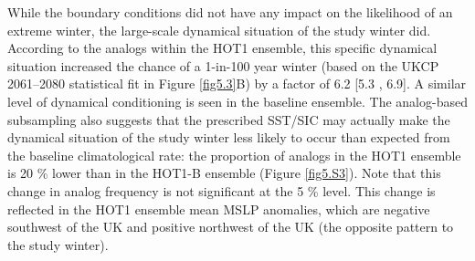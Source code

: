       While the boundary conditions did not have any impact on the likelihood of an extreme winter, the large-scale dynamical situation of the study winter did. According to the analogs within the HOT1 ensemble, this specific dynamical situation increased the chance of a 1-in-100 year winter (based on the UKCP 2061--2080 statistical fit in Figure \ref{fig5.3}B) by a factor of 6.2 [5.3 , 6.9]. A similar level of dynamical conditioning is seen in the baseline ensemble. The analog-based subsampling also suggests that the prescribed SST/SIC may actually make the dynamical situation of the study winter less likely to occur than expected from the baseline climatological rate: the proportion of analogs in the HOT1 ensemble is 20 \% lower than in the HOT1-B ensemble (Figure \ref{fig5.S3}). Note that this change in analog frequency is not significant at the 5 \% level. This change is reflected in the HOT1 ensemble mean MSLP anomalies, which are negative southwest of the UK and positive northwest of the UK (the opposite pattern to the study winter).

